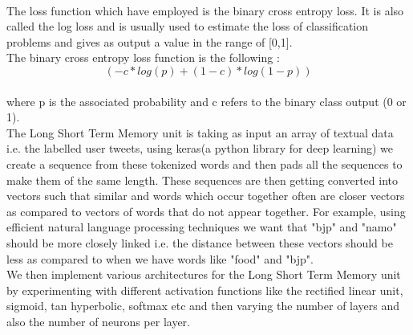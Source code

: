 \documentclass[a4paper,11pt]{article}
\begin{document}
\medskip\\
The loss function which have employed is the binary cross entropy loss. It is also called the log loss and is usually used to estimate the loss of classification problems and gives as output a value in the range of [0,1].
\medskip\\
The binary cross entropy loss function is the following :
\begin{equation}
    (-c * log(p) + (1 - c) * log(1 - p))
 \end{equation}
\\
where p is the associated probability and c refers to the binary class output (0 or 1).
\medskip\\
The Long Short Term Memory unit is taking as input an array of textual data i.e. the labelled user tweets, using keras(a python library for deep learning) we create a sequence from these tokenized words and then pads all the sequences to make them of the same length. These sequences are then getting converted into vectors such that similar and words which occur together often are closer vectors as compared to vectors of words that do not appear together.
For example, using efficient natural language processing techniques we want that "bjp" and "namo" should be more closely linked i.e. the distance between these vectors should be less as compared to when we have words like "food" and "bjp".
\medskip\\
We then implement various architectures for the Long Short Term Memory unit by experimenting with different activation functions like the rectified linear unit, sigmoid, tan hyperbolic, softmax etc and then varying the number of layers and also the number of neurons per layer.
\newpage
\end{document}
